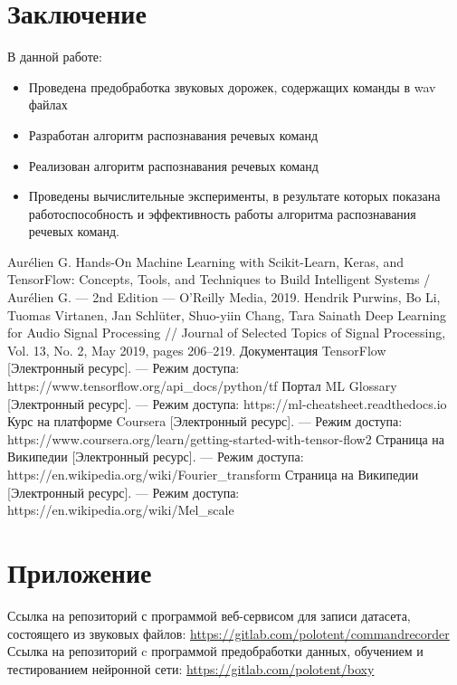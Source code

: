 \documentclass[14pt]{article}
\begin{document}
\section*{Заключение}
В данной работе:
\begin{itemize}[leftmargin=2cm]
\item Проведена предобработка звуковых дорожек, содержащих команды в wav файлах
\item Разработан алгоритм распознавания речевых команд
\item Реализован алгоритм распознавания речевых команд
\item Проведены вычислительные эксперименты, в результате которых	 показана работоспособность и эффективность работы алгоритма распознавания речевых команд.
\end{itemize}
\newpage

\begin{thebibliography}{3}
Aurélien G. Hands-On Machine Learning with Scikit-Learn, Keras, and TensorFlow: Concepts, Tools, and Techniques to Build Intelligent Systems / Aurélien G. --- 2nd Edition --- O'Reilly Media, 2019.
Hendrik Purwins, Bo Li, Tuomas Virtanen, Jan Schlüter, Shuo-yiin Chang, Tara Sainath Deep Learning for Audio Signal Processing // Journal  of  Selected  Topics  of  Signal  Processing,  Vol.  13,  No.  2,  May  2019, pages 206–219.
Документация TensorFlow [Электронный ресурс]. --- Режим доступа: https://www.tensorflow.org/api\_docs/python/tf
Портал ML Glossary [Электронный ресурс]. --- Режим доступа: https://ml-cheatsheet.readthedocs.io
Курс на платформе Coursera [Электронный ресурс]. --- Режим доступа: https://www.coursera.org/learn/getting-started-with-tensor-flow2
Страница на Википедии [Электронный ресурс]. --- Режим доступа: https://en.wikipedia.org/wiki/Fourier\_transform
Страница на Википедии [Электронный ресурс]. --- Режим доступа: https://en.wikipedia.org/wiki/Mel\_scale

\end{thebibliography}
\newpage

\section*{Приложение}
Ссылка на репозиторий с программой веб-сервисом для записи датасета, состоящего из звуковых файлов: \url{https://gitlab.com/polotent/commandrecorder} \\

Ссылка на репозиторий c программой предобработки данных, обучением и тестированием нейронной сети: \url{https://gitlab.com/polotent/boxy}
\restoregeometry
\end{document}
